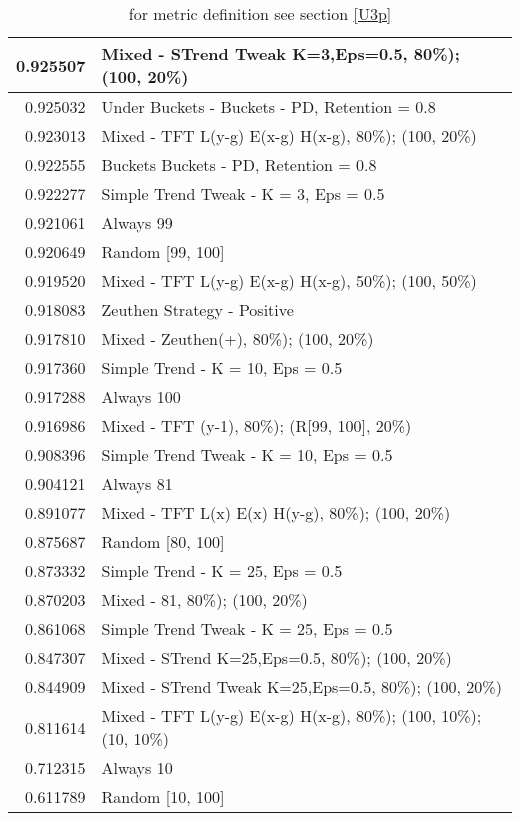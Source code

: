 \begin{table}[!hbtp]
\begin{footnotesize}
\begin{tabular}{|r|l|}
0.925507 & Mixed - {STrend Tweak K=3,Eps=0.5, 80\%); (100, 20\%)}\\ \hline
0.925032 & Under Buckets - Buckets - PD, Retention = 0.8\\ \hline
0.923013 & Mixed - {TFT L(y-g) E(x-g) H(x-g), 80\%); (100, 20\%)}\\ \hline
0.922555 & Buckets Buckets - PD, Retention = 0.8\\ \hline
0.922277 & Simple Trend Tweak - K = 3, Eps = 0.5\\ \hline
0.921061 & Always 99\\ \hline
0.920649 & Random [99, 100]\\ \hline
0.919520 & Mixed - {TFT L(y-g) E(x-g) H(x-g), 50\%); (100, 50\%)}\\ \hline
0.918083 & Zeuthen Strategy - Positive\\ \hline
0.917810 & Mixed - {Zeuthen(+), 80\%); (100, 20\%)}\\ \hline
0.917360 & Simple Trend - K = 10, Eps = 0.5\\ \hline
0.917288 & Always 100\\ \hline
0.916986 & Mixed - {TFT (y-1), 80\%); (R[99, 100], 20\%)}\\ \hline
0.908396 & Simple Trend Tweak - K = 10, Eps = 0.5\\ \hline
0.904121 & Always 81\\ \hline
0.891077 & Mixed - {TFT L(x) E(x) H(y-g), 80\%); (100, 20\%)}\\ \hline
0.875687 & Random [80, 100]\\ \hline
0.873332 & Simple Trend - K = 25, Eps = 0.5\\ \hline
0.870203 & Mixed - {81, 80\%); (100, 20\%)}\\ \hline
0.861068 & Simple Trend Tweak - K = 25, Eps = 0.5\\ \hline
0.847307 & Mixed - {STrend K=25,Eps=0.5, 80\%); (100, 20\%)}\\ \hline
0.844909 & Mixed - {STrend Tweak K=25,Eps=0.5, 80\%); (100, 20\%)}\\ \hline
0.811614 & Mixed - {TFT L(y-g) E(x-g) H(x-g), 80\%); (100, 10\%); (10, 10\%)}\\ \hline
0.712315 & Always 10\\ \hline
0.611789 & Random [10, 100]\\ \hline
\end{tabular}
\caption{for metric definition see section \eqref{U3p}}
\end{footnotesize}
\end{table}

